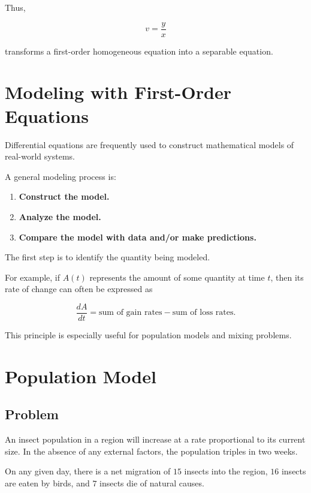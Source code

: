\documentclass[11pt]{article}
\begin{document}
Thus,

\[
\boxed{
v=\frac{y}{x}
}
\]

transforms a first-order homogeneous equation into a separable
equation.

\section{Modeling with First-Order Equations}

Differential equations are frequently used to construct mathematical
models of real-world systems.

A general modeling process is:

\begin{enumerate}
    \item \textbf{Construct the model.}
    \item \textbf{Analyze the model.}
    \item \textbf{Compare the model with data and/or make predictions.}
\end{enumerate}

The first step is to identify the quantity being modeled.

For example, if \(A(t)\) represents the amount of some quantity at
time \(t\), then its rate of change can often be expressed as

\[
\boxed{
\frac{dA}{dt}
=
\text{sum of gain rates}
-
\text{sum of loss rates}.
}
\]

This principle is especially useful for population models and
mixing problems.

\section{Population Model}

\subsection{Problem}

An insect population in a region will increase at a rate proportional
to its current size. In the absence of any external factors, the
population triples in two weeks.

On any given day, there is a net migration of \(15\) insects into the
region, \(16\) insects are eaten by birds, and \(7\) insects die of
natural causes.
\end{document}

